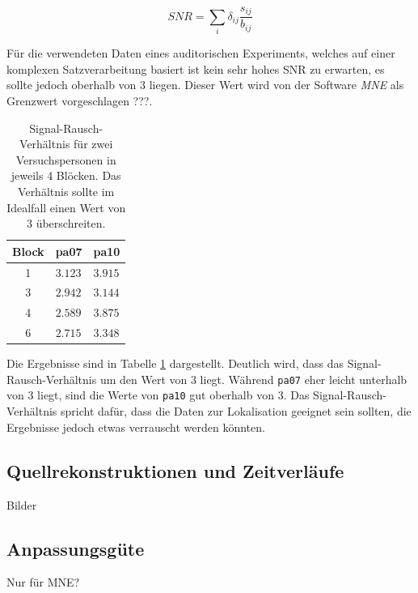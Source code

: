 \documentclass[doc,a4paper,12pt]{apa6}
\begin{document}
\begin{equation}
SNR = \sum_i \delta_{ij} \frac{s_{ij}}{b_{ij}}
\end{equation}

Für die verwendeten Daten eines auditorischen Experiments, welches auf einer komplexen Satzverarbeitung basiert ist kein sehr hohes SNR zu erwarten, es sollte jedoch oberhalb von $3$ liegen. Dieser Wert wird von der Software \emph{MNE} als Grenzwert vorgeschlagen ???.

\begin{table}[t]
\caption{}
\label{tab:snr}
\vspace*{3mm}
\begin{tabularx}{\textwidth}{cll}
Block & pa07 & pa10 \\
\hline
1 & $3.123$ & $3.915$\\
3 & $2.942$ & $3.144$\\
4 & $2.589$ & $3.875$\\
6 & $2.715$ & $3.348$\\
\hline
\end{tabularx}
\vspace*{3mm}
\caption*{Signal-Rausch-Verhältnis für zwei Versuchspersonen in jeweils 4 Blöcken. Das Verhältnis sollte im Idealfall einen Wert von $3$ überschreiten.}
\end{table}

Die Ergebnisse sind in Tabelle \ref{tab:snr} dargestellt. Deutlich wird, dass das Signal-Rausch-Verhältnis um den Wert von $3$ liegt. Während \texttt{pa07} eher leicht unterhalb von $3$ liegt, sind die Werte von \texttt{pa10} gut oberhalb von $3$. Das Signal-Rausch-Verhältnis spricht dafür, dass die Daten zur Lokalisation geeignet sein sollten, die Ergebnisse jedoch etwas verrauscht werden könnten.

\subsection{Quellrekonstruktionen und Zeitverläufe}

Bilder

\subsection{Anpassungsgüte}

Nur für MNE?


\newpage
\end{document}
